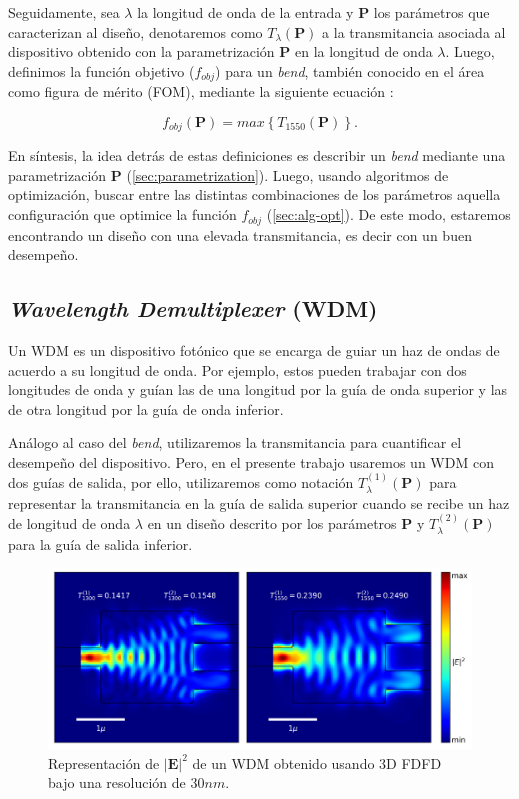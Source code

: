 Seguidamente, sea $\lambda$ la longitud de onda de la entrada y $\boldsymbol{P}$ los parámetros que caracterizan al
diseño, denotaremos como $T_{\lambda}(\boldsymbol{P})$ a la transmitancia asociada al dispositivo obtenido con la
parametrización $\boldsymbol{P}$ en la longitud de onda $\lambda$. Luego, definimos la función objetivo 
($f_{obj}$) para un \emph{bend}, también conocido en el área como figura de mérito (FOM), 
mediante la siguiente ecuación \citep{Su2020}:

\begin{equation}
  f_{obj}(\boldsymbol{P}) = max \left \{ T_{1550} (\boldsymbol{P}) \right \}.
\label{eq:fom-bend}
\end{equation}

En síntesis, la idea detrás de estas definiciones es describir un \emph{bend} mediante una parametrización
$\boldsymbol{P}$
(\autoref{sec:parametrization}).
Luego, usando algoritmos de optimización, buscar entre las distintas combinaciones de los parámetros aquella configuración
que optimice la función $f_{obj}$ (\autoref{sec:alg-opt}).
De este modo, estaremos encontrando un diseño con una elevada transmitancia, es decir con un buen desempeño.

\subsection{\emph{Wavelength Demultiplexer} (WDM)}

Un WDM es un dispositivo fotónico que se encarga de guiar un haz de ondas de acuerdo a su longitud de onda.
Por ejemplo, estos pueden trabajar con dos longitudes de onda y guían las de una longitud por la guía de onda superior
y las de otra longitud por la guía de onda inferior.

Análogo al caso del \emph{bend}, utilizaremos la transmitancia para cuantificar el desempeño del dispositivo.
Pero, en el presente trabajo usaremos un WDM con dos guías de salida, por ello, utilizaremos como notación
$T_{\lambda}^{(1)}(\boldsymbol{P})$ para
representar la transmitancia en la guía de salida superior cuando se recibe un haz de longitud de onda
$\lambda$ en un diseño descrito por los parámetros $\boldsymbol{P}$ y $T_{\lambda}^{(2)}(\boldsymbol{P})$ para la guía de salida inferior.

\begin{figure}[ht]
  \centering
  \includegraphics[scale=0.7]{image/theory/wdm_field_dx30_px16_px16.png}
  \caption{Representación de $|\boldsymbol{E}|^2$ de un WDM obtenido usando 3D FDFD bajo una resolución de $30 nm$.}
  \label{fig:efield-wdm}
\end{figure}

